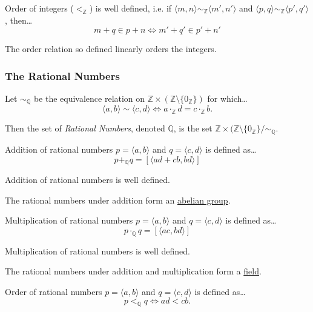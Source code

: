 \begin{lemma}
Order of integers ($<_{\mathbb{Z}}$) is well defined, i.e. if $\langle m,n \rangle \sim_{\mathbb{Z}} \langle m',n' \rangle$ and $\langle p,q \rangle \sim_{\mathbb{Z}} \langle p',q' \rangle$, then\dots
$$m + q \in p + n \Leftrightarrow m' + q' \in p' + n'$$
\end{lemma}

\noindent The order relation so defined linearly orders the integers.

\subsubsection{The Rational Numbers}\label{rationals}

Let $\sim_{\mathbb{Q}}$ be the equivalence relation on $\mathbb{Z} \times (\mathbb{Z} \setminus \{0_{\mathbb{Z}}\})$ for which\dots
$$\langle a,b \rangle \sim \langle c,d \rangle \Leftrightarrow a \cdot_{\mathbb{Z}} d = c \cdot_{\mathbb{Z}} b.$$

\noindent Then the set of \emph{Rational Numbers}, denoted $\mathbb{Q}$, is the set $\mathbb{Z} \times (\mathbb{Z} \setminus \{ 0_{\mathbb{Z}} \} / \sim_{\mathbb{Q}}.$

Addition of rational numbers $p = \langle a, b \rangle$ and $q = \langle c, d \rangle$ is defined as\dots
$$p +_{\mathbb{Q}} q = [\langle ad+cb, bd \rangle]$$

\begin{lemma}
Addition of rational numbers is well defined.
\end{lemma}

\noindent The rational numbers under addition form an \hyperref[grouptheory]{abelian group}.

Multiplication of rational numbers $p = \langle a, b \rangle$ and $q = \langle c, d \rangle$ is defined as\dots
$$p \cdot_{\mathbb{Q}} q = [\langle ac, bd \rangle]$$

\begin{lemma}
Multiplication of rational numbers is well defined.
\end{lemma}

\noindent The rational numbers under addition and multiplication form a \hyperref[ringtheory]{field}.

Order of rational numbers $p = \langle a, b \rangle$ and $q = \langle c, d \rangle$ is defined as\dots
$$p <_{\mathbb{Q}} q \Leftrightarrow ad < cb.$$

